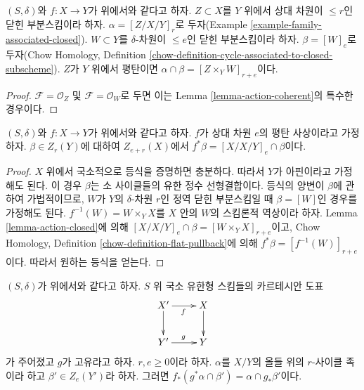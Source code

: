 \begin{lemma}
\label{lemma-action-closed}
$(S, \delta)$와 $f : X \to Y$가 위에서와 같다고 하자. $Z \subset X$를
$Y$ 위에서 상대 차원이 $\leq r$인 닫힌 부분스킴이라 하자.
$\alpha = [Z/X/Y]_r$로 두자(Example
\ref{example-family-associated-closed}). $W \subset Y$를
$\delta$-차원이 $\leq e$인 닫힌 부분스킴이라 하자.
$\beta = [W]_e$로 두자(Chow Homology, Definition
\ref{chow-definition-cycle-associated-to-closed-subscheme}). $Z$가 $Y$
위에서 평탄이면 $\alpha \cap \beta = [Z \times_Y W]_{r + e}$이다.
\end{lemma}

\begin{proof}
$\mathcal{F} = \mathcal{O}_Z$ 및 $\mathcal{F} = \mathcal{O}_W$로 두면
이는 Lemma \ref{lemma-action-coherent}의 특수한 경우이다.
\end{proof}

\begin{lemma}
\label{lemma-flat-pullback-as-action}
$(S, \delta)$와 $f : X \to Y$가 위에서와 같다고 하자. $f$가 상대 차원
$e$의 평탄 사상이라고 가정하자. $\beta \in Z_r(Y)$에 대하여
$Z_{e + r}(X)$에서 $f^*\beta = [X/X/Y]_e \cap \beta$이다.
\end{lemma}

\begin{proof}
$X$ 위에서 국소적으로 등식을 증명하면 충분하다. 따라서 $Y$가
아핀이라고 가정해도 된다. 이 경우 $\beta$는 소 사이클들의 유한
정수 선형결합이다. 등식의 양변이 $\beta$에 관하여 가법적이므로,
$W$가 $Y$의 $\delta$-차원 $r$인 정역 닫힌 부분스킴일 때
$\beta = [W]$인 경우를 가정해도 된다. $f^{-1}(W) = W \times_Y X$를
$X$ 안의 $W$의 스킴론적 역상이라 하자. Lemma
\ref{lemma-action-closed}에 의해
$[X/X/Y]_e \cap \beta = [W \times_Y X]_{r + e}$이고, Chow Homology,
Definition \ref{chow-definition-flat-pullback}에 의해
$f^*\beta = [f^{-1}(W)]_{r + e}$이다. 따라서 원하는 등식을 얻는다.
\end{proof}

\begin{lemma}
\label{lemma-action-push-pull}
$(S, \delta)$가 위에서와 같다고 하자. $S$ 위 국소 유한형 스킴들의
카르테시안 도표
$$
\xymatrix{
X' \ar[r]_f \ar[d] & X \ar[d] \\
Y' \ar[r]^g & Y
}
$$
가 주어졌고 $g$가 고유라고 하자. $r, e \geq 0$이라 하자. $\alpha$를
$X/Y$의 올들 위의 $r$-사이클 족이라 하고 $\beta' \in Z_e(Y')$라
하자. 그러면 $f_*(g^*\alpha \cap \beta') = \alpha \cap g_*\beta'$이다.
\end{lemma}


